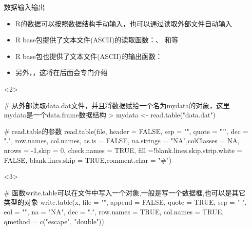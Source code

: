 \documentclass{beamerthemeMono}
\begin{document}
\begin{frame}[t,fragile]{\subsecname}{数据输入输出}
\begin{itemize}
\item<1-> R的数据可以按照数据结构手动输入，也可以通过读取外部文件自动输入
\item<2-> R base包提供了文本文件(ASCII)的读取函数：、
                     和等
\item<3-> R base包也提供了文本文件(ASCII)的输出函数：
\item<4-> 另外，，这将在后面会专门介绍
\end{itemize}

\begin{overlayarea}{\textwidth}{\textheight}
\begin{onlyenv}<2>
\begin{rcode}
# 从外部读取data.dat文件，并且将数据赋给一个名为mydata的对象，这里mydata是一个data.frame数据结构
> mydata <- read.table("data.dat")

# read.table的参数
read.table(file, header = FALSE, sep = "", quote = "\"’", dec = ".", row.names, col.names, as.is = FALSE, na.strings = "NA",colClasses = NA, nrows = -1,skip = 0, check.names = TRUE, fill =!blank.lines.skip,strip.white = FALSE, blank.lines.skip = TRUE,comment.char = "#")
\end{rcode}
\end{onlyenv}

\begin{onlyenv}<3>
\begin{rcode}
# 函数write.table可以在文件中写入一个对象,一般是写一个数据框,也可以是其它类型的对象
write.table(x, file = "", append = FALSE, quote = TRUE, sep = " ", eol = "\n", na = "NA", dec = ".", row.names = TRUE, col.names = TRUE, qmethod = c("escape", "double"))
\end{rcode}
\end{onlyenv}

\end{overlayarea}
\end{frame}
\end{document}

